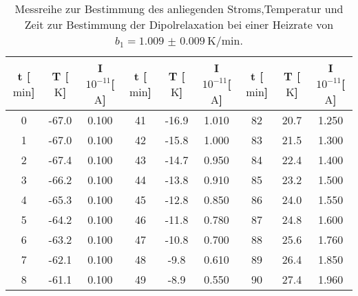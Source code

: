 \begin{table}
    \centering
    \caption{Messreihe zur Bestimmung des anliegenden Stroms,\newline Temperatur und Zeit zur Bestimmung der Dipolrelaxation bei einer Heizrate von $b_1 = \SI{1.009(9)}{\kelvin\per\minute}$.} 
    \label{tab:WhoIsBigInJapan?1}
    \begin{tabular}{c c c@{\hskip 0.5cm}||@{\hskip 0.5cm} c c c@{\hskip 0.5cm} ||@{\hskip 0.5cm} c c c}
        \toprule
        t [$\si{\minute}$] & T [$\si{\kelvin}$] &  I $10^{-11}$[$\si{\ampere}$] & t [$\si{\minute}$] & T [$\si{\kelvin}$] &  I $10^{-11}$[$\si{\ampere}$] & t [$\si{\minute}$] & T [$\si{\kelvin}$] &  I $10^{-11}$[$\si{\ampere}$] \\
        \midrule
0   &    -67.0      &     0.100   & 41  &    -16.9    &       1.010   &  82  &    20.7     &       1.250  \\ 
1   &    -67.0      &     0.100   & 42  &    -15.8    &       1.000   &  83  &    21.5     &       1.300  \\                                        
2   &    -67.4    &       0.100   & 43  &    -14.7    &       0.950   &  84  &    22.4     &       1.400   \\                                    
3   &    -66.2    &       0.100   & 44  &    -13.8    &       0.910   &  85  &    23.2     &       1.500   \\                                      
4   &    -65.3    &       0.100   & 45  &    -12.8    &       0.850   &  86  &    24.0     &       1.550  \\                                      
5   &    -64.2    &       0.100   & 46  &    -11.8    &       0.780   &  87  &    24.8     &       1.600   \\                                      
6   &    -63.2    &       0.100   & 47  &    -10.8    &       0.700    &  88  &    25.6     &       1.760  \\                                      
7   &    -62.1    &       0.100   & 48  &    -9.8     &       0.610   &  89  &    26.4     &       1.850  \\                                      
8   &    -61.1    &       0.100   & 49  &    -8.9     &       0.550   &  90  &    27.4     &       1.960  \\                                      

\end{tabular}
\end{table}
